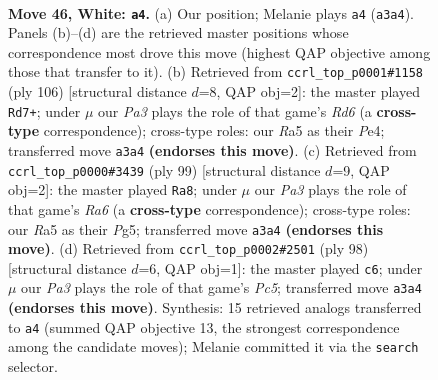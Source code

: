\documentclass[11pt]{article}
\begin{document}
\clearpage

\begin{figure}[p]\centering
\begin{subfigure}{0.46\textwidth}\centering
\resizebox{\linewidth}{!}{%
\newchessgame
\chessboard[
  setfen={6k1/7r/8/R7/8/P5K1/8/8 w - - 3 46},
  showmover=false,
  pgfstyle=straightmove, color=movearrow, markmove={a3-a4}
]}
\caption{}
\end{subfigure}\hfill
\begin{subfigure}{0.46\textwidth}\centering
\resizebox{\linewidth}{!}{%
\newchessgame
\chessboard[
  setfen={6r1/5k2/3R4/8/4Pp2/8/5K2/8 w - - 1 54},
  showmover=false,
  pgfstyle=straightmove, color=movearrow, markmove={d6-d7}
]}
\caption{}
\end{subfigure}
\\[4pt]
\begin{subfigure}{0.46\textwidth}\centering
\resizebox{\linewidth}{!}{%
\newchessgame
\chessboard[
  setfen={8/6k1/8/6pP/8/r7/6K1/5R2 b - - 3 50},
  showmover=false,
  pgfstyle=straightmove, color=movearrow, markmove={a3-a8}
]}
\caption{}
\end{subfigure}\hfill
\begin{subfigure}{0.46\textwidth}\centering
\resizebox{\linewidth}{!}{%
\newchessgame
\chessboard[
  setfen={8/2K5/4p3/2P5/6k1/3r4/8/2R5 w - - 9 50},
  showmover=false,
  pgfstyle=straightmove, color=movearrow, markmove={c5-c6}
]}
\caption{}
\end{subfigure}
\caption{\textbf{Move 46, White: \texttt{a4}.} (a) Our position; Melanie plays \texttt{a4} (\texttt{a3a4}). Panels (b)--(d) are the retrieved master positions whose correspondence most drove this move (highest QAP objective among those that transfer to it). (b) Retrieved from \texttt{ccrl\_top\_p0001\#1158} (ply 106) [structural distance $d$=8, QAP obj=2]: the master played \texttt{Rd7+}; under $\mu$ our \emph{Pa3} plays the role of that game's \emph{Rd6} (a \textbf{cross-type} correspondence); cross-type roles: our \emph{R}a5 as their \emph{P}e4; transferred move \texttt{a3a4} \textbf{(endorses this move)}. (c) Retrieved from \texttt{ccrl\_top\_p0000\#3439} (ply 99) [structural distance $d$=9, QAP obj=2]: the master played \texttt{Ra8}; under $\mu$ our \emph{Pa3} plays the role of that game's \emph{Ra6} (a \textbf{cross-type} correspondence); cross-type roles: our \emph{R}a5 as their \emph{P}g5; transferred move \texttt{a3a4} \textbf{(endorses this move)}. (d) Retrieved from \texttt{ccrl\_top\_p0002\#2501} (ply 98) [structural distance $d$=6, QAP obj=1]: the master played \texttt{c6}; under $\mu$ our \emph{Pa3} plays the role of that game's \emph{Pc5}; transferred move \texttt{a3a4} \textbf{(endorses this move)}. Synthesis: 15 retrieved analogs transferred to \texttt{a4} (summed QAP objective 13, the strongest correspondence among the candidate moves); Melanie committed it via the \texttt{search} selector.}
\label{fig:thought-m90}
\end{figure}
\end{document}
